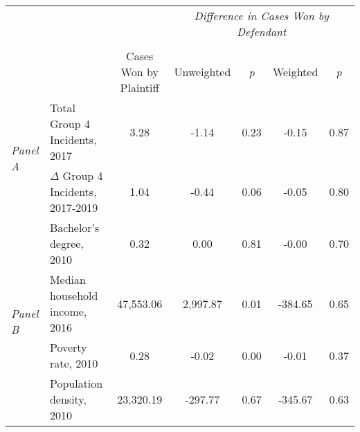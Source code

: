 \begin{tabular}{llccccc}
\toprule
 &  & \textit{} & \multicolumn{4}{c}{\textit{Difference in Cases Won by Defendant}} \\
\cline{4-7}
\\
 &  & Cases Won by Plaintiff & Unweighted & \emph{p} & Weighted & \emph{p} \\
\midrule
\multirow[c]{2}{.75cm}{\textit{Panel A}} & Total Group 4 Incidents, 2017 & 3.28 & -1.14 & 0.23 & -0.15 & 0.87 \\
 & $\Delta$ Group 4 Incidents, 2017-2019 & 1.04 & -0.44 & 0.06 & -0.05 & 0.80 \\
\cline{1-7}
\multirow[c]{4}{.75cm}{\textit{Panel B}} & Bachelor's degree, 2010 & 0.32 & 0.00 & 0.81 & -0.00 & 0.70 \\
 & Median household income, 2016 & 47,553.06 & 2,997.87 & 0.01 & -384.65 & 0.65 \\
 & Poverty rate, 2010 & 0.28 & -0.02 & 0.00 & -0.01 & 0.37 \\
 & Population density, 2010 & 23,320.19 & -297.77 & 0.67 & -345.67 & 0.63 \\
\cline{1-7}
\bottomrule
\end{tabular}
